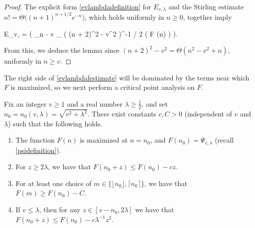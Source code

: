 	\begin{proof} 
	
	The explicit form \eqref{evlambdadefinition} for $E_{v, \lambda}$ and the Stirling estimate $n! = \Theta \big( (n + 1)^{n + 1 /2} e^{- n} \big)$, which holds uniformly in $n \ge 0$, together imply 
	\begin{flalign*}
	E_{v, \lambda} = \Theta \Bigg( \displaystyle\sum_{n - v  _{}} \big( (n + 2)^2  - v^2 \big)^{-1 / 2} \exp \big( F (n) \big) \Bigg).
	\end{flalign*} 
	
	\noindent From this, we deduce the lemma since $(n + 2)^2 - v^2 = \Theta (n^2 - v^2 + n)$, uniformly in $n \ge v$. 
	\end{proof} 
	
	The right side of \eqref{evlambdafestimate} will be dominated by the terms near which $F$ is maximized, so we next perform a critical point analysis on $F$. 
	
	\begin{lemma} 
	
	\label{fn0}
	
	Fix an integer $v \ge 1$ and a real number $\lambda \ge \frac{1}{2}$, and set $n_0 = n_0 (v, \lambda) =  \sqrt{v^2 + \lambda^2}$. There exist constants $c, C > 0$ (independent of $v$ and $\lambda$) such that the following holds.
	
	\begin{enumerate}
	    \item The function $F (n)$ is maximized at $n = n_0$, and $F (n_0) = \Psi_{v, \lambda}$ (recall \eqref{psidefinition}). 
	   
	    \item For $z \ge 2 \lambda$, we have that $F (n_0 + z) \le F (n_0) - c z$.
	    
	    \item For at least one choice of $m \in \big\{ \lfloor n_0 \rfloor, \lceil n_0 \rceil \big\}$, we have that $F (m) \ge F (n_0) - C$.
	    
	    \item If $v \le \lambda$, then for any $z \in [v - n_0, 2 \lambda]$ we have that $F (n_0 + z) \le F (n_0) - c \lambda^{-1} z^2$.
	     
	\end{enumerate}
	\end{lemma} 
	
